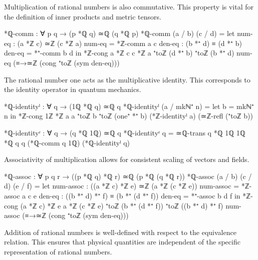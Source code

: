 \documentclass[11pt,a4paper]{book}
\begin{document}
Multiplication of rational numbers is also commutative. This property is vital for the definition of inner products and metric tensors.

\begin{code}
*ℚ-comm : ∀ p q → (p *ℚ q) ≃ℚ (q *ℚ p)
*ℚ-comm (a / b) (c / d) =
  let num-eq : (a *ℤ c) ≃ℤ (c *ℤ a)
      num-eq = *ℤ-comm a c
      den-eq : (b *⁺ d) ≡ (d *⁺ b)
      den-eq = *⁺-comm b d
  in *ℤ-cong {a *ℤ c} {c *ℤ a} {⁺toℤ (d *⁺ b)} {⁺toℤ (b *⁺ d)}
             num-eq (≡→≃ℤ (cong ⁺toℤ (sym den-eq)))
\end{code}

The rational number one acts as the multiplicative identity. This corresponds to the identity operator in quantum mechanics.

\begin{code}
*ℚ-identityˡ : ∀ q → (1ℚ *ℚ q) ≃ℚ q
*ℚ-identityˡ (a / mkℕ⁺ n) = 
  let b = mkℕ⁺ n
  in *ℤ-cong {1ℤ *ℤ a} {a} {⁺toℤ b} {⁺toℤ (one⁺ *⁺ b)}
          (*ℤ-identityˡ a)
          (≃ℤ-refl (⁺toℤ b))

*ℚ-identityʳ : ∀ q → (q *ℚ 1ℚ) ≃ℚ q
*ℚ-identityʳ q = ≃ℚ-trans {q *ℚ 1ℚ} {1ℚ *ℚ q} {q} (*ℚ-comm q 1ℚ) (*ℚ-identityˡ q)
\end{code}

Associativity of multiplication allows for consistent scaling of vectors and fields.

\begin{code}
*ℚ-assoc : ∀ p q r → ((p *ℚ q) *ℚ r) ≃ℚ (p *ℚ (q *ℚ r))
*ℚ-assoc (a / b) (c / d) (e / f) =
  let num-assoc : ((a *ℤ c) *ℤ e) ≃ℤ (a *ℤ (c *ℤ e))
      num-assoc = *ℤ-assoc a c e
      den-eq : ((b *⁺ d) *⁺ f) ≡ (b *⁺ (d *⁺ f))
      den-eq = *⁺-assoc b d f
  in *ℤ-cong {(a *ℤ c) *ℤ e} {a *ℤ (c *ℤ e)} 
             {⁺toℤ (b *⁺ (d *⁺ f))} {⁺toℤ ((b *⁺ d) *⁺ f)}
             num-assoc (≡→≃ℤ (cong ⁺toℤ (sym den-eq)))
\end{code}

Addition of rational numbers is well-defined with respect to the equivalence relation. This ensures that physical quantities are independent of the specific representation of rational numbers.
\end{document}
